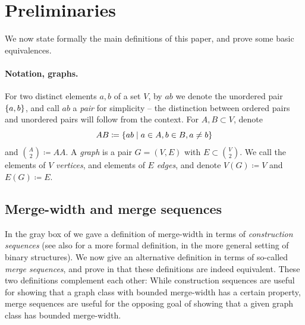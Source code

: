 \section{Preliminaries}\label{sec:prelims}

We now state formally the main definitions of this paper, and prove some basic equivalences. 

       \paragraph{Notation, graphs.}
       For two distinct elements $a,b$ of a set $V$,
by $ab$ we denote the unordered pair $\{a,b\}$, and call $ab$ a \emph{pair} for simplicity
-- the distinction between ordered pairs and unordered pairs will follow from the context.
For $A,B\subset V$, denote $$AB\coloneqq \{ab\mid a\in A,b\in B,a\neq b\}$$ and ${A\choose 2}\coloneqq AA$.
A \emph{graph} is a pair $G=(V,E)$ with $E\subset {V\choose 2}$.
We call the elements of $V$ \emph{vertices}, and elements of $E$ \emph{edges}, and denote $V(G)\coloneqq V$ and $E(G)\coloneqq E$. 

\subsection{Merge-width and merge sequences}\label{sec:merge-sequence}

In the gray box of  we gave a definition of merge-width in terms of \emph{construction sequences}
(see also  for a more formal definition, in the more general setting of binary structures).
We now give an alternative definition in terms of so-called \emph{merge sequences}, and prove in 
that these definitions are indeed equivalent.
These two definitions complement each other: 
While construction sequences are useful for showing that a graph class with bounded merge-width has a certain property,
merge sequences are useful for the opposing goal of showing that a given graph class has bounded merge-width.


